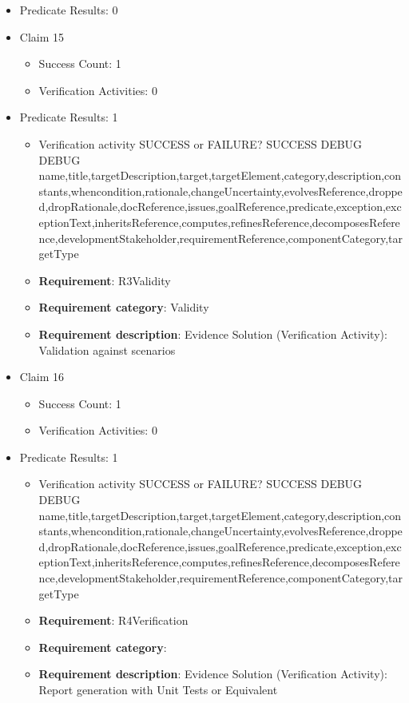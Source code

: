\documentclass{article}
\begin{document}
\begin{itemize}
\begin{itemize}
				\end{itemize}
				
									    
				\item Predicate Results: 0

  				  \item Claim 15
				\begin{itemize}
			    	\item Success Count: 1 
			    	\item Verification Activities: 0
				\end{itemize}
				
									    
				\item Predicate Results: 1
					\begin{itemize}				
					\item Verification activity SUCCESS or FAILURE? SUCCESS
					DEBUG DEBUG name,title,targetDescription,target,targetElement,category,description,constants,whencondition,rationale,changeUncertainty,evolvesReference,dropped,dropRationale,docReference,issues,goalReference,predicate,exception,exceptionText,inheritsReference,computes,refinesReference,decomposesReference,developmentStakeholder,requirementReference,componentCategory,targetType
					\item \textbf{Requirement}: R3Validity 
					\item \textbf{Requirement category}: Validity
					\item \textbf{Requirement description}: Evidence Solution (Verification Activity): Validation against scenarios
					\end{itemize}

  				  \item Claim 16
				\begin{itemize}
			    	\item Success Count: 1 
			    	\item Verification Activities: 0
				\end{itemize}
				
									    
				\item Predicate Results: 1
					\begin{itemize}				
					\item Verification activity SUCCESS or FAILURE? SUCCESS
					DEBUG DEBUG name,title,targetDescription,target,targetElement,category,description,constants,whencondition,rationale,changeUncertainty,evolvesReference,dropped,dropRationale,docReference,issues,goalReference,predicate,exception,exceptionText,inheritsReference,computes,refinesReference,decomposesReference,developmentStakeholder,requirementReference,componentCategory,targetType
					\item \textbf{Requirement}: R4Verification 
					\item \textbf{Requirement category}: 
					\item \textbf{Requirement description}: Evidence Solution (Verification Activity): Report generation with Unit Tests or Equivalent
					\end{itemize}


\end{itemize}
\end{document}
